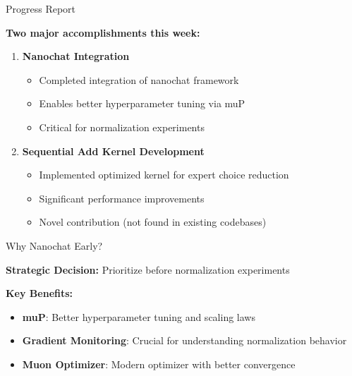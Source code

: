 \documentclass{beamer}
\begin{document}
\begin{frame}{Progress Report}

\textbf{Two major accomplishments this week:}

\vspace{0.5cm}

\begin{enumerate}
    \item \textbf{Nanochat Integration}
    \begin{itemize}
        \item Completed integration of nanochat framework
        \item Enables better hyperparameter tuning via muP
        \item Critical for normalization experiments
    \end{itemize}

    \vspace{0.3cm}

    \item \textbf{Sequential Add Kernel Development}
    \begin{itemize}
        \item Implemented optimized kernel for expert choice reduction
        \item Significant performance improvements
        \item Novel contribution (not found in existing codebases)
    \end{itemize}
\end{enumerate}

\end{frame}

\begin{frame}{Why Nanochat Early?}

\textbf{Strategic Decision:} Prioritize before normalization experiments

\vspace{0.4cm}

\textbf{Key Benefits:}
\begin{itemize}
    \item \textbf{muP}: Better hyperparameter tuning and scaling laws

    \vspace{0.2cm}
    \item \textbf{Gradient Monitoring}: Crucial for understanding normalization behavior

    \vspace{0.2cm}
    \item \textbf{Muon Optimizer}: Modern optimizer with better convergence
\end{itemize}

\end{frame}
\end{document}
